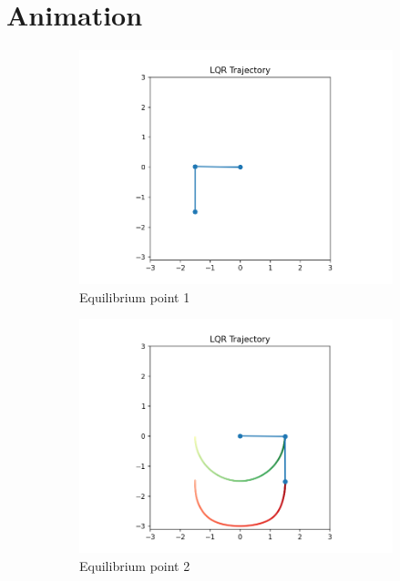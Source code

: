 \chapter{Animation}
\begin{figure}[htb]
    \centering
    \begin{subfigure}[b]{0.6\textwidth}
        \centering
        \includegraphics[width=\linewidth]{img/Animation/Eq1.png}
        \caption{Equilibrium point 1}
        \label{fig:eq1}
    \end{subfigure}
    \hfill
    \begin{subfigure}[b]{0.6\textwidth}
        \centering
        \includegraphics[width=\linewidth]{img/Animation/Eq2.png}
        \caption{Equilibrium point 2}
        \label{fig:eq2}
    \end{subfigure}
    \caption{}
    \label{fig:equilibrium-set1}
\end{figure}

